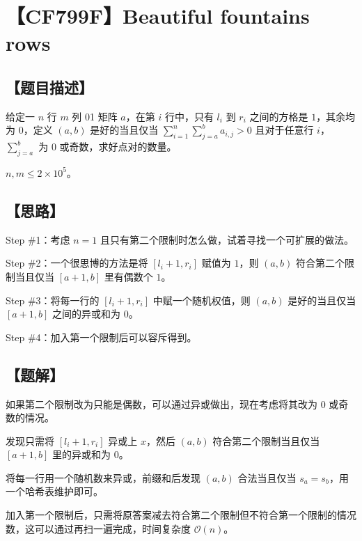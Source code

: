 \documentclass[UTF8,12pt,a4paper]{ctexart} %
\begin{document}
	\fontsize{12pt}{12pt}\selectfont
	
	\newpage
	\pagestyle{fancy}
	
	\section*{【CF799F】Beautiful fountains rows}
	
	\subsection*{【题目描述】}
	
	给定一 $n$ 行 $m$ 列 01 矩阵 $a$，在第 $i$ 行中，只有 $l_i$ 到 $r_i$ 之间的方格是 $1$，其余均为 $0$，定义 $(a,b)$ 是好的当且仅当 $\sum\limits_{i=1}^{n}\sum\limits_{j=a}^{b}a_{i,j}>0$ 且对于任意行 $i$，$\sum\limits_{j=a}^{b}$ 为 $0$ 或奇数，求好点对的数量。
	
	$n,m\le2\times10^5$。
	
	\subsection*{【思路】}
	
	Step \#1：考虑 $n=1$ 且只有第二个限制时怎么做，试着寻找一个可扩展的做法。
	
	Step \#2：一个很思博的方法是将 $[l_i+1,r_i]$ 赋值为 $1$，则 $(a,b)$ 符合第二个限制当且仅当 $[a+1,b]$ 里有偶数个 $1$。
	
	Step \#3：将每一行的 $[l_i+1,r_i]$ 中赋一个随机权值，则 $(a,b)$ 是好的当且仅当 $[a+1,b]$ 之间的异或和为 $0$。
	
	Step \#4：加入第一个限制后可以容斥得到。
	
	\subsection*{【题解】}
	
	如果第二个限制改为只能是偶数，可以通过异或做出，现在考虑将其改为 $0$ 或奇数的情况。
	
	发现只需将 $[l_i+1,r_i]$ 异或上 $x$，然后 $(a,b)$ 符合第二个限制当且仅当 $[a+1,b]$ 里的异或和为 $0$。
	
	将每一行用一个随机数来异或，前缀和后发现 $(a,b)$ 合法当且仅当 $s_a=s_b$，用一个哈希表维护即可。
	
	加入第一个限制后，只需将原答案减去符合第二个限制但不符合第一个限制的情况数，这可以通过再扫一遍完成，时间复杂度 $\mathcal{O}(n)$。
	
\end{document}
